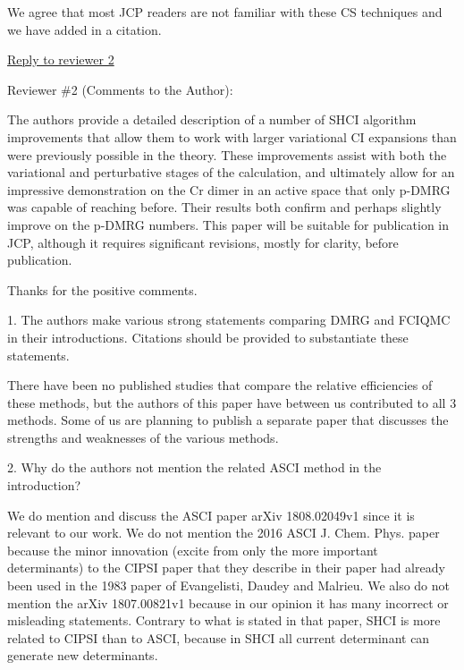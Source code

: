 \documentclass[
preprint,
onecolumn,
 superscriptaddress,
 amsmath,amssymb,
 aps,
]{revtex4-1}
\begin{document}
We agree that most JCP readers are not familiar with these CS techniques and we have added in
a citation.

\vskip 8mm
\noindent\underline{Reply to reviewer 2}

\vskip 5mm {\color{blue}

Reviewer \#2 (Comments to the Author):

The authors provide a detailed description of a number of SHCI algorithm improvements that
allow them to work with larger variational CI expansions than were previously possible in the
theory. These improvements assist with both the variational and perturbative stages of the
calculation, and ultimately allow for an impressive demonstration on the Cr dimer in an active
space that only p-DMRG was capable of reaching before. Their results both confirm and perhaps
slightly improve on the p-DMRG numbers. This paper will be suitable for publication in JCP,
although it requires significant revisions, mostly for clarity, before publication.
}\color{black}

Thanks for the positive comments.

\vskip 5mm {\color{blue}

1. The authors make various strong statements comparing DMRG and FCIQMC in their
introductions. Citations should be provided to substantiate these statements.
}\color{black}

There have been no published studies that compare the relative efficiencies of these methods,
but the authors of this paper have
between us contributed to all 3 methods.  Some of us are planning to publish a separate paper
that discusses the strengths and weaknesses
of the various methods.

\vskip 5mm {\color{blue}
2. Why do the authors not mention the related ASCI method in the introduction?
}\color{black}

We do mention and discuss the ASCI paper arXiv 1808.02049v1 since it is relevant to our work.
We do not mention the 2016 ASCI J. Chem. Phys. paper because the minor innovation (excite from
only the more important determinants) to the CIPSI paper that they
describe in their paper had already been used in the 1983 paper of Evangelisti, Daudey and Malrieu.
We also do not mention the arXiv 1807.00821v1 because in our opinion it has many incorrect or
misleading statements.  Contrary to what is stated in that paper, SHCI is more related to CIPSI
than to ASCI, because in SHCI all current determinant can generate new determinants.
\end{document}
